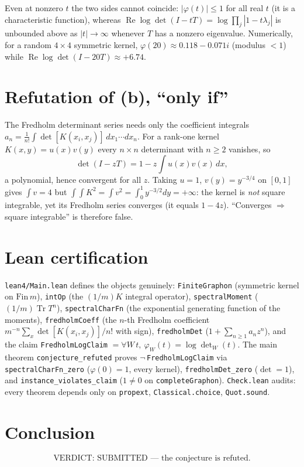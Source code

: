 \documentclass[11pt]{article}
\begin{document}
Even at nonzero $t$ the two sides cannot coincide: $|\varphi(t)|\le 1$ for
all real $t$ (it is a characteristic function), whereas
$\operatorname{Re}\log\det(I-tT)=\log\prod_j|1-t\lambda_j|$ is unbounded
above as $|t|\to\infty$ whenever $T$ has a nonzero eigenvalue.
Numerically, for a random $4\times4$ symmetric kernel,
$\varphi(20)\approx 0.118-0.071i$ (modulus $<1$) while
$\operatorname{Re}\log\det(I-20T)\approx +6.74$.

\section*{Refutation of (b), ``only if''}
The Fredholm determinant series needs only the coefficient integrals
$a_n=\frac1{n!}\int\det[K(x_i,x_j)]\,dx_1\cdots dx_n$.  For a rank-one kernel
$K(x,y)=u(x)v(y)$ every $n\times n$ determinant with $n\ge 2$ vanishes, so
\[
\det(I-zT)=1-z\!\int\! u(x)v(x)\,dx,
\]
a polynomial, hence convergent for all $z$.  Taking $u=1$,
$v(y)=y^{-3/4}$ on $[0,1]$ gives $\int v=4$ but
$\int\!\!\int K^2=\int v^2=\int_0^1 y^{-3/2}dy=+\infty$: the kernel is
\emph{not} square integrable, yet its Fredholm series converges (it equals
$1-4z$).  ``Converges $\Rightarrow$ square integrable'' is therefore false.

\section*{Lean certification}
\texttt{lean4/Main.lean} defines the objects genuinely:
\texttt{FiniteGraphon} (symmetric kernel on $\mathrm{Fin}\,m$),
\texttt{intOp} (the $(1/m)K$ integral operator), \texttt{spectralMoment}
($(1/m)\operatorname{Tr}T^n$), \texttt{spectralCharFn} (the exponential
generating function of the moments), \texttt{fredholmCoeff} (the $n$-th
Fredholm coefficient $m^{-n}\sum_x\det[K(x_i,x_j)]/n!$ with sign),
\texttt{fredholmDet} ($1+\sum_{n\ge1}a_nz^n$), and the claim
\texttt{FredholmLogClaim} $=\forall W\,t,\ \varphi_W(t)=\log\det_W(t)$.
The main theorem \texttt{conjecture\_refuted} proves
$\neg$\,\texttt{FredholmLogClaim} via \texttt{spectralCharFn\_zero}
($\varphi(0)=1$, every kernel), \texttt{fredholmDet\_zero} ($\det=1$), and
\texttt{instance\_violates\_claim} ($1\ne0$ on \texttt{completeGraphon}).
\texttt{Check.lean} audits: every theorem depends only on
\texttt{propext}, \texttt{Classical.choice}, \texttt{Quot.sound}.

\section*{Conclusion}
\[
\boxed{\;\text{VERDICT: SUBMITTED --- the conjecture is refuted.}\;}
\]
\end{document}
